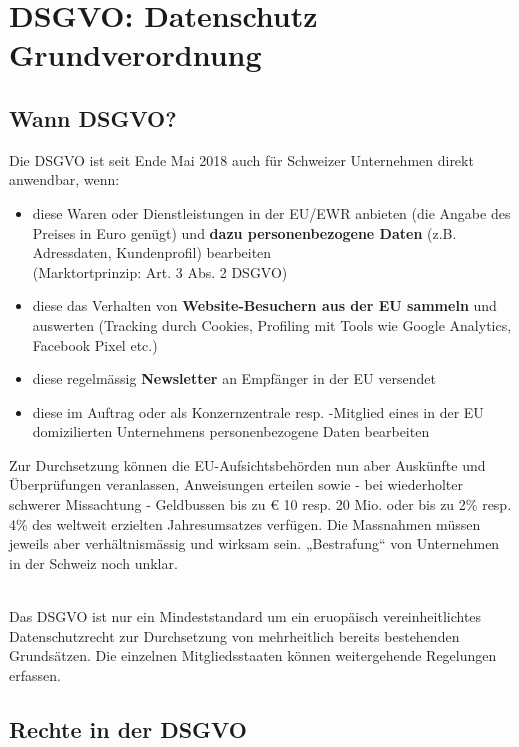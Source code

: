 \section{DSGVO: Datenschutz Grundverordnung}

\subsection{Wann DSGVO?}

Die DSGVO ist seit Ende Mai 2018 auch für Schweizer Unternehmen direkt
anwendbar, wenn:
\begin{itemize}
	\tightlist
	\item diese Waren oder Dienstleistungen in der EU/EWR anbieten
	(die Angabe des Preises in Euro genügt) und \textbf{dazu
	personenbezogene Daten} (z.B. Adressdaten, Kundenprofil) bearbeiten\\
	(Marktortprinzip: Art. 3 Abs. 2 DSGVO)
	\item diese das Verhalten von
	\textbf{Website-Besuchern aus der EU sammeln} und auswerten (Tracking
	durch Cookies, Profiling mit Tools wie Google Analytics, Facebook Pixel
	etc.)
	\item  diese regelmässig \textbf{Newsletter} an Empfänger in der EU
	versendet
	\item  diese im Auftrag oder als Konzernzentrale resp. -Mitglied
	eines in der EU domizilierten Unternehmens personenbezogene Daten
	bearbeiten
\end{itemize}

Zur Durchsetzung können die EU-Aufsichtsbehörden nun aber Auskünfte und
Überprüfungen veranlassen, Anweisungen erteilen sowie - bei wiederholter
schwerer Missachtung - Geldbussen bis zu € 10 resp. 20 Mio. oder bis zu 2\%
resp. 4\% des weltweit erzielten Jahresumsatzes verfügen. Die Massnahmen
müssen jeweils aber verhältnismässig und wirksam sein. „Bestrafung“ von
Unternehmen in der Schweiz noch unklar.

\mbox{}\\
Das DSGVO ist nur ein Mindeststandard um ein eruopäisch
vereinheitlichtes Datenschutzrecht zur Durchsetzung von mehrheitlich
bereits bestehenden Grundsätzen. Die einzelnen Mitgliedsstaaten können
weitergehende Regelungen erfassen.


\subsection{Rechte in der DSGVO}

